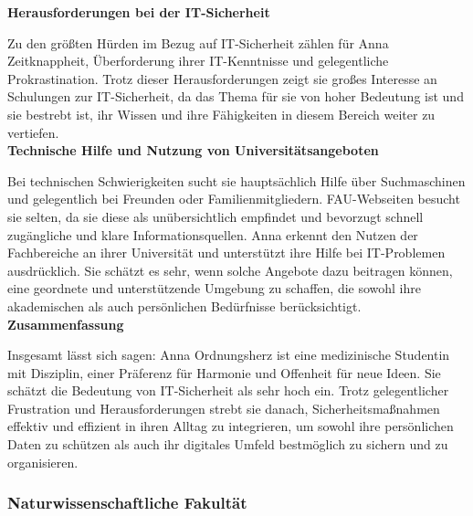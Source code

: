 \documentclass[german,report]{i1thesis}
\begin{document}
\textbf{Herausforderungen bei der IT-Sicherheit}

Zu den größten Hürden im Bezug auf IT-Sicherheit zählen für Anna Zeitknappheit, Überforderung ihrer IT-Kenntnisse und gelegentliche Prokrastination. Trotz dieser Herausforderungen zeigt sie großes Interesse an Schulungen zur IT-Sicherheit, da das Thema für sie von hoher Bedeutung ist und sie bestrebt ist, ihr Wissen und ihre Fähigkeiten in diesem Bereich weiter zu vertiefen.\\

\textbf{Technische Hilfe und Nutzung von Universitätsangeboten}

Bei technischen Schwierigkeiten sucht sie hauptsächlich Hilfe über Suchmaschinen und gelegentlich bei Freunden oder Familienmitgliedern. FAU-Webseiten besucht sie selten, da sie diese als unübersichtlich empfindet und bevorzugt schnell zugängliche und klare Informationsquellen. Anna erkennt den Nutzen der Fachbereiche an ihrer Universität und unterstützt ihre Hilfe bei IT-Problemen ausdrücklich. Sie schätzt es sehr, wenn solche Angebote dazu beitragen können, eine geordnete und unterstützende Umgebung zu schaffen, die sowohl ihre akademischen als auch persönlichen Bedürfnisse berücksichtigt.\\

\textbf{Zusammenfassung}

Insgesamt lässt sich sagen: Anna Ordnungsherz ist eine medizinische Studentin mit Disziplin, einer Präferenz für Harmonie und Offenheit für neue Ideen. Sie schätzt die Bedeutung von IT-Sicherheit als sehr hoch ein. Trotz gelegentlicher Frustration und Herausforderungen strebt sie danach, Sicherheitsmaßnahmen effektiv und effizient in ihren Alltag zu integrieren, um sowohl ihre persönlichen Daten zu schützen als auch ihr digitales Umfeld bestmöglich zu sichern und zu organisieren.

\subsubsection{Naturwissenschaftliche Fakultät}
\end{document}
